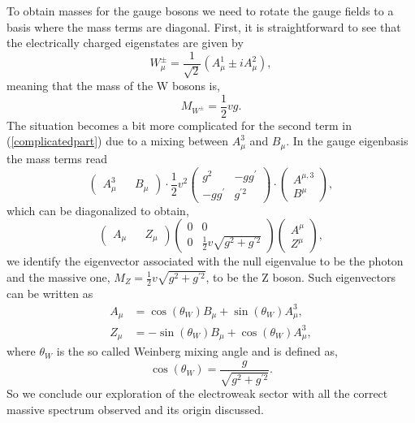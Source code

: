 %
To obtain masses for the gauge bosons we need to rotate the gauge fields to a basis where the mass terms are diagonal. First, it is straightforward to see that the electrically charged eigenstates are given by %
\begin{equation}
W^\pm_\mu = \frac{1}{\sqrt{2}} (A^{1}_\mu \pm i A^{2}_\mu) , 
\label{gagestate}
\end{equation}
meaning that the mass of the W bosons is, 
\begin{equation}
M_{W^\pm}= \frac{1}{2} v g .
\end{equation}
%
The situation becomes a bit more complicated for the second term in (\ref{complicatedpart}) due to a mixing between $A_\mu^3$ and $B_\mu$. In the gauge eigenbasis the mass terms read
%
\begin{equation}
\begin{pmatrix}
A_\mu^3 && B_\mu
\end{pmatrix} \cdot  \frac{1}{2} v^2 \begin{pmatrix}
g^2  & -g g^\prime \\
-g g^\prime & g^{\prime 2} 
\end{pmatrix} \cdot \begin{pmatrix}
A^{\mu,3} \\  B^\mu
\end{pmatrix}  , 
\end{equation} 
%
which can be diagonalized to obtain,
%
\begin{equation}
\begin{pmatrix}
A_\mu && Z_\mu 
\end{pmatrix} \begin{pmatrix}
0  & 0 \\
0  & \frac{1}{2} v \sqrt{g^2 + g^{\prime 2}} 
\end{pmatrix}  \begin{pmatrix}
A^\mu \\ Z^\mu
\end{pmatrix} , 
\end{equation}
%
we identify the eigenvector associated with the null eigenvalue to be the photon and the massive one, $ M_Z =  \frac{1}{2} v \sqrt{g^2 + g^{\prime 2}} $, to be the Z boson. Such eigenvectors can be written as
%
\begin{align}
A_\mu &=\cos(\theta_W) B_\mu + \sin(\theta_W) A_\mu^3 ,  \\  
Z_\mu & =- \sin(\theta_W) B_\mu + \cos(\theta_W) A_\mu^3 , 
\end{align}
%
where $\theta_W$ is the so called Weinberg mixing angle and is defined as, 
%
\begin{equation}
\cos(\theta_W)=\frac{g}{ \sqrt{g^2 + g^{\prime 2}}} . 
\end{equation}
%
%
So we conclude our exploration of the electroweak sector with all the correct massive spectrum observed and its origin discussed.

